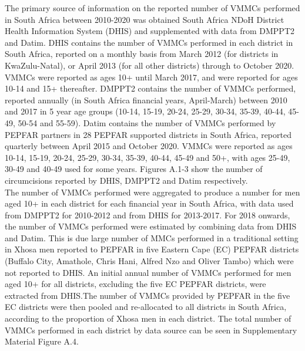 \documentclass{article}
\begin{document}
\begin{appendix}
\noindent The primary source of information on the reported number of VMMCs performed in South Africa between 2010-2020 was obtained South Africa NDoH District Health Information System (DHIS) and supplemented with data from DMPPT2 and Datim. DHIS contains the number of VMMCs performed in each district in South Africa, reported on a monthly basis from March 2012 (for districts in KwaZulu-Natal), or April 2013 (for all other districts) through to October 2020. VMMCs were reported as ages 10+ until March 2017, and were reported for ages 10-14 and 15+ thereafter. DMPPT2 contains the number of VMMCs performed, reported annually (in South Africa financial years, April-March) between 2010 and 2017 in 5 year age groups (10-14, 15-19, 20-24, 25-29, 30-34, 35-39, 40-44, 45-49, 50-54 and 55-59). Datim contains the number of VMMCs performed by PEPFAR partners in 28 PEPFAR supported districts in South Africa, reported quarterly between April 2015 and October 2020. VMMCs were reported as ages 10-14, 15-19, 20-24, 25-29, 30-34, 35-39, 40-44, 45-49 and 50+, with ages 25-49, 30-49 and 40-49 used for some years. Figures A.1-3 show the number of circumcisions reported by DHIS, DMPPT2 and Datim respectively.  \\

\noindent The number of VMMCs performed were aggregated to produce a number for men aged 10+ in each district for each financial year in South Africa, with data used from DMPPT2 for 2010-2012 and from DHIS for 2013-2017. For 2018 onwards, the number of VMMCs performed were estimated by combining data from DHIS and Datim. This is due large number of MMCs performed in a traditional setting in Xhosa men reported to PEPFAR in five Eastern Cape (EC) PEPFAR districts (Buffalo City, Amathole, Chris Hani, Alfred Nzo and Oliver Tambo) which were not reported to DHIS. An initial annual number of VMMCs performed for men aged 10+ for all districts, excluding the five EC PEPFAR districts, were extracted from DHIS.The number of VMMCs provided by PEPFAR in the five EC districts were then pooled and re-allocated to all districts in South Africa, according to the proportion of Xhosa men in each district. The total number of VMMCs performed in each district by data source can be seen in Supplementary Material Figure A.4.  \\




\end{appendix}
\end{document}

